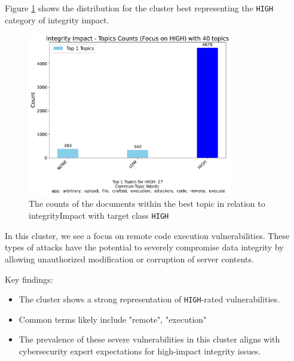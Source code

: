 \documentclass[12pt]{article}
\begin{document}
Figure \ref{fig:integrityImpact_60_HIGH} shows the distribution for the cluster best representing the \texttt{HIGH} category of integrity impact.

\begin{figure}[ht]
	\centering
	\includegraphics[width=0.8\textwidth]{figures/integrityImpact/merged_top_k_topics_category_focus_counts_integrityImpact_HIGH_k1.pdf}
	\caption{The counts of the documents within the best topic in relation to integrityImpact with target class \texttt{HIGH}}
	\label{fig:integrityImpact_60_HIGH}
\end{figure}

In this cluster, we see a focus on remote code execution vulnerabilities. These
types of attacks have the potential to severely compromise data integrity by allowing unauthorized
modification or corruption of server contents.

Key findings:
\begin{itemize}

	\item The cluster shows a strong representation of \texttt{HIGH}-rated vulnerabilities.

	\item Common terms likely include "remote", "execution"

	\item The prevalence of these severe vulnerabilities in this cluster aligns with cybersecurity
	      expert expectations for high-impact integrity issues.

\end{itemize}
\end{document}
